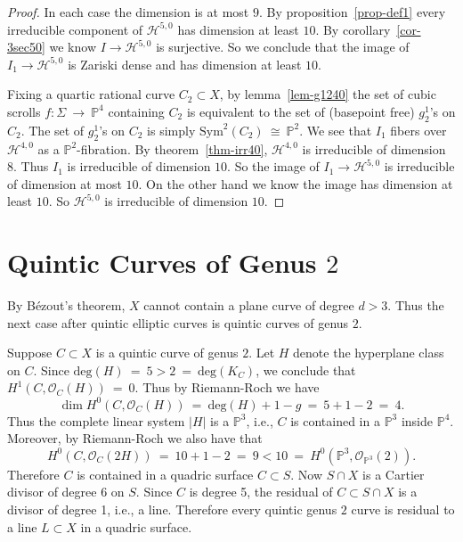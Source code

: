 \documentclass[twoside,12pt,reqno]{amsart}
\theoremstyle{plain}
\theoremstyle{definition}
\newcommand{\Hdg}[2]{\mathcal{H}^{#1,#2}}
\newcommand{\PP}{\mathbb{P}}
\def\ps{\vspace{4pt}}
\newcommand{\OO}{\mathcal O}
\begin{document}
\begin{proof}
\ps

In each case the dimension is at most $9$.  
By proposition~\ref{prop-def1} every irreducible component of
$\Hdg{5}{0}$ has dimension at least $10$.  By
corollary~\ref{cor-3sec50} we know $I\rightarrow \Hdg{5}{0}$ is
surjective.  So we conclude that the image of $I_1\rightarrow
\Hdg{5}{0}$ is Zariski dense and has dimension at least $10$.

\ps

Fixing a quartic rational curve
$C_2\subset X$, by lemma~\ref{lem-g1240} the set of cubic scrolls
$f:\Sigma~\rightarrow~ \PP^4$ containing 
$C_2$ is equivalent to the set of (basepoint free) $g^1_2$'s on $C_2$.
The set of 
$g^1_2$'s on $C_2$ is simply $\text{Sym}^2(C_2)~\cong~\PP^2$.
We see that $I_1$ fibers over $\Hdg{4}{0}$ as a
$\PP^2$-fibration.  By theorem~\ref{thm-irr40}, $\Hdg{4}{0}$ is
irreducible of dimension $8$.  Thus $I_1$ is irreducible of dimension $10$.
So the image of $I_1\rightarrow \Hdg{5}{0}$ is irreducible of
dimension at most $10$.  On the other hand we know the image has
dimension at least $10$.  So $\Hdg{5}{0}$ is irreducible of dimension $10$.
\end{proof}



\section{Quintic Curves of Genus $2$}

By B\'ezout's theorem, $X$ cannot contain a plane curve of degree
$d>3$.  Thus the next case after quintic elliptic curves is quintic
curves of genus $2$.  

\ps

Suppose $C\subset X$ is a quintic curve of genus
$2$.  Let $H$ denote the hyperplane class on $C$.  Since
$\text{deg}(H)~=~5 > 2 ~=~ \text{deg}(K_C)$, we conclude that
$H^1(C,\OO_C(H))~=~0$.  Thus by Riemann-Roch we have
\begin{equation}
\dim H^0(C,\OO_C(H)) ~=~ \text{deg}(H)+1-g~=~5+1-2~=~4.
\end{equation}
Thus the complete linear system $|H|$ is a $\PP^3$, i.e., $C$ is
contained in a $\PP^3$ inside $\PP^4$.  Moreover, by Riemann-Roch we
also have that 
\begin{equation}
H^0(C,\OO_C(2H))~=~10+1-2~=~9 < 10 ~=~ H^0(\PP^3,\OO_{\PP^3}(2)).
\end{equation}
Therefore $C$ is contained in a quadric surface $C\subset S$.  Now
$S\cap X$ is a Cartier divisor of degree $6$ on $S$.  Since $C$ is
degree 5, the residual of $C\subset S\cap X$ is a divisor of degree 1,
i.e., a line.  Therefore every quintic genus $2$ curve is residual to a
line $L\subset X$ in a quadric surface.  
\end{document}
